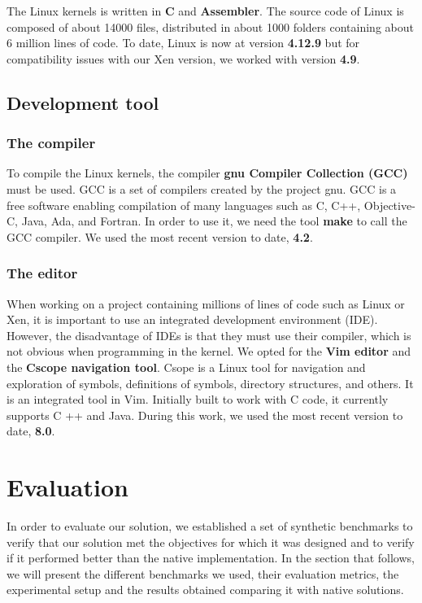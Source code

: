 The Linux \glspl{kernel} is written in \textbf{C} and \textbf{Assembler}. The source code of Linux is composed of about 14000 files, distributed in about 1000 folders containing about 6 million lines of code. To date, Linux is now at version \textbf{4.12.9} but for compatibility issues with our Xen version, we worked with version \textbf{4.9}.

\subsection{Development tool}
\subsubsection{The compiler}
To compile the Linux \glspl{kernel}, the compiler \textbf{\acrshort{gnu} Compiler Collection (GCC)} must be used. GCC is a set of compilers created by the project \acrshort{gnu}. GCC is a free software enabling compilation of many languages such as C, C++, Objective-C, Java, Ada, and Fortran. In order to use it, we need the tool \textbf{make} to call the GCC compiler. We used the most recent version to date, \textbf{4.2}.
\subsubsection{The editor}

When working on a project containing millions of lines of code such as Linux or Xen, it is important to use an integrated development environment (IDE). However, the disadvantage of IDEs is that they must use their compiler, which is not obvious when programming in the kernel. We opted for the \textbf{Vim editor} and the \textbf{Cscope navigation tool}. Csope is a Linux tool for navigation and exploration of symbols, definitions of symbols, directory structures, and others. It is an integrated tool in Vim. Initially built to work with C code, it currently supports C ++ and Java. During this work, we used the most recent version to date, \textbf{8.0}.

\section{Evaluation}

In order to evaluate our solution, we established a set of synthetic benchmarks to verify that our solution met the objectives for which it was designed and to verify if it performed better than the native implementation. In the section that follows, we will present the different benchmarks we used, their evaluation metrics, the experimental setup and the results obtained comparing it with native solutions. 

